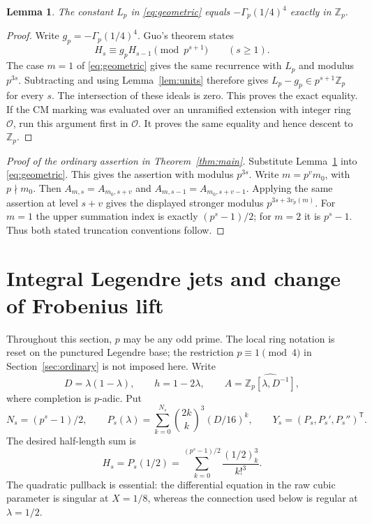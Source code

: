 \documentclass[11pt,a4paper]{article}
\newtheorem{lemma}[theorem]{Lemma}
\begin{document}
\begin{lemma}\label{lem:scalar}
The constant $L_p$ in \eqref{eq:geometric} equals
$-\Gamma_p(1/4)^4$ exactly in $\mathbb Z_p$.
\end{lemma}
\begin{proof}
Write $g_p=-\Gamma_p(1/4)^4$. Guo's theorem
\cite[arXiv equation~(1.9)]{Guo} states
\[
 H_s\equiv g_pH_{s-1}\pmod{p^{s+1}}\qquad(s\ge1).
\]
The case $m=1$ of \eqref{eq:geometric} gives the same recurrence with
$L_p$ and modulus $p^{3s}$. Subtracting and using Lemma~\ref{lem:units}
therefore gives $L_p-g_p\in p^{s+1}\mathbb Z_p$ for every $s$.
The intersection of these ideals is zero. This proves the exact equality.
If the CM marking was evaluated over an unramified extension with
integer ring $\mathcal O$, run this argument first in $\mathcal O$.
It proves the same equality and hence descent to $\mathbb Z_p$.
\end{proof}

\begin{proof}[Proof of the ordinary assertion in Theorem~\ref{thm:main}]
Substitute Lemma~\ref{lem:scalar} into \eqref{eq:geometric}. This gives
the assertion with modulus $p^{3s}$. Write $m=p^v m_0$, with $p\nmid m_0$.
Then $A_{m,s}=A_{m_0,s+v}$ and
$A_{m,s-1}=A_{m_0,s+v-1}$. Applying the same assertion at level $s+v$
gives the displayed stronger modulus $p^{3s+3v_p(m)}$.
For $m=1$ the upper summation index is exactly $(p^s-1)/2$; for $m=2$
it is $p^s-1$. Thus both stated truncation conventions follow.
\end{proof}


\section{Integral Legendre jets and change of Frobenius lift}\label{sec:jets}

Throughout this section, $p$ may be any odd prime. The local ring
notation is reset on the punctured Legendre base; the restriction
$p\equiv1\pmod4$ in Section~\ref{sec:ordinary} is not imposed here.
Write
\[
 D=\lambda(1-\lambda),\qquad h=1-2\lambda,\qquad
 A=\widehat{\mathbb Z_p[\lambda,D^{-1}]},
\]
where completion is $p$-adic.  Put
\[
 N_s=(p^s-1)/2,\qquad
 P_s(\lambda)=\sum_{k=0}^{N_s}\binom{2k}{k}^3(D/16)^k,
 \qquad Y_s=(P_s,P_s',P_s'')^{\mathsf T}.
\]
The desired half-length sum is
\[
 H_s=P_s(1/2)=\sum_{k=0}^{(p^s-1)/2}\frac{(1/2)_k^3}{k!^3}.
\]
The quadratic pullback is essential: the differential equation in the
raw cubic parameter is singular at $X=1/8$, whereas the connection used
below is regular at $\lambda=1/2$.
\end{document}
